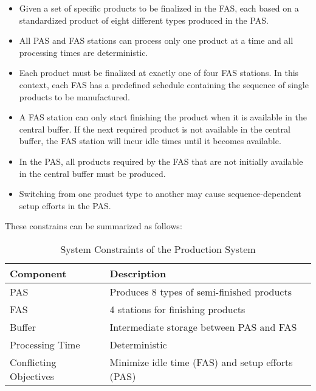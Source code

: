 \begin{itemize}
    \item Given a set of specific products to be finalized in the FAS, each based on a standardized product of eight different types produced in the PAS.
    \item All PAS and FAS stations can process only one product at a time and all processing times are deterministic.
    \item Each product must be finalized at exactly one of four FAS stations. In this context, each FAS has a predefined schedule containing the sequence of single products to be manufactured.
    \item A FAS station can only start finishing the product when it is available in the central buffer. If the next required product is not available in the central buffer, the FAS station will incur idle times until it becomes available.
    \item In the PAS, all products required by the FAS that are not initially available in the central buffer must be produced.
    \item Switching from one product type to another may cause sequence-dependent setup efforts in the PAS.
\end{itemize}

These constrains can be summarized as follows:

\begin{table}[ht!]
    \footnotesize
    \centering
    \caption{System Constraints of the Production System}
    \label{t:system_constraints}
    \begin{tabularx}{\textwidth}{lX}
        \toprule
        \textbf{Component}     & \textbf{Description}                             \\
        \midrule
        PAS                    & Produces 8 types of semi-finished products       \\
        FAS                    & 4 stations for finishing products                \\
        Buffer                 & Intermediate storage between PAS and FAS         \\
        Processing Time        & Deterministic                                    \\
        Conflicting Objectives & Minimize idle time (FAS) and setup efforts (PAS) \\
        \bottomrule
    \end{tabularx}
\end{table}
\FloatBarrier


